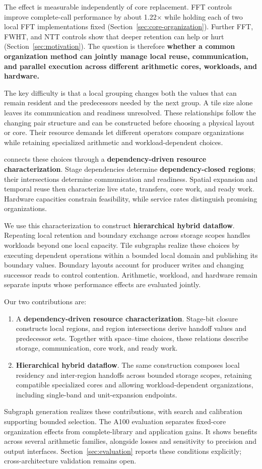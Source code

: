 The effect is measurable independently of core replacement. FFT controls
improve complete-call performance by about 1.22$\times$ while holding each
of two local FFT implementations fixed (Section~\ref{sec:core-organization}). Further
FFT, FWHT, and NTT controls show that deeper retention can help or hurt
(Section~\ref{sec:motivation}). The question is therefore
\textbf{whether a common organization method can jointly manage local reuse,
communication, and parallel execution across different arithmetic cores,
workloads, and hardware.}

The key difficulty is that a local grouping changes both the values that can
remain resident and the predecessors needed by the next group. A tile size
alone leaves its communication and readiness unresolved. These relationships
follow the changing pair structure and can be constructed before choosing a
physical layout or core. Their resource demands let different operators
compare organizations while retaining specialized arithmetic and
workload-dependent choices.

\system{} connects these choices through a \textbf{dependency-driven
resource characterization}. Stage dependencies determine
\textbf{dependency-closed regions}; their intersections determine communication
and readiness. Spatial expansion and temporal reuse then characterize live
state, transfers, core work, and ready work. Hardware capacities constrain
feasibility, while service rates distinguish promising organizations.

We use this characterization to construct \textbf{hierarchical hybrid
dataflow}. Repeating local retention and boundary exchange across storage
scopes handles workloads beyond one local capacity. Tile subgraphs realize
these choices by executing dependent operations within a bounded local domain
and publishing its boundary values. Boundary layouts account
for producer writes and changing successor reads to control contention.
Arithmetic, workload, and hardware remain separate inputs whose performance
effects are evaluated jointly.

Our two contributions are:
\begin{enumerate}
\item A \textbf{dependency-driven resource characterization}. Stage-bit
closure constructs local regions, and region intersections derive handoff
values and predecessor sets. Together with space--time choices, these
relations describe storage, communication, core work, and ready work.
\item \textbf{Hierarchical hybrid dataflow}. The same construction composes
local residency and inter-region handoffs across bounded storage scopes,
retaining compatible specialized cores and allowing workload-dependent
organizations, including single-band and unit-expansion endpoints.
\end{enumerate}
Subgraph generation realizes these contributions, with search and calibration
supporting bounded selection. The A100 evaluation separates fixed-core
organization effects from complete-library and application gains. It shows
benefits across several arithmetic families, alongside losses and sensitivity
to precision and output interfaces. Section~\ref{sec:evaluation} reports these
conditions explicitly; cross-architecture validation remains open.
